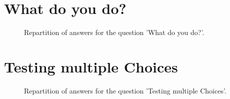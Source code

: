 \documentclass[12pt]{article}
\date{May 22, 2019}
\begin{document}
\clearpage{}
\section{What do you do?}

\label{sec:2}


\begin{figure}[h!]
    \caption{\label{figure:q2-1}Repartition of answers for the question 'What do you do?'.}
\end{figure}



\clearpage{}
\section{Testing multiple Choices}

\label{sec:3}


\begin{figure}[h!]
    \caption{\label{figure:q3-1}Repartition of answers for the question 'Testing multiple Choices'.}
\end{figure}
\end{document}
